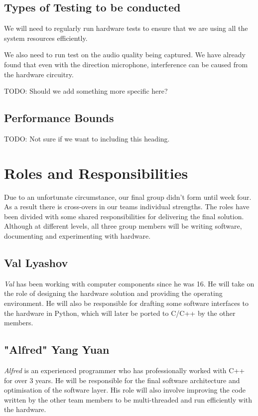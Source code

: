 \documentclass[11pt,a4paper,titlepage]{report}
\begin{document}
\subsection{Types of Testing to be conducted}

We will need to regularly run hardware tests to ensure that we are using all the system resources efficiently.

We also need to run test on the audio quality being captured. We have already found that even with the direction microphone, interference can be caused from the hardware circuitry. 

{\color{red} TODO: Should we add something more specific here? }


\subsection{Performance Bounds}

{\color{red} TODO: Not sure if we want to including this heading.  }




\section{Roles and Responsibilities}



Due to an unfortunate circumstance, our final group didn't form until week four. As a result there is cross-overs in our teams individual strengths. The roles have been divided with some shared responsibilities for delivering the final solution. Although at different levels, all three group members will be writing software, documenting and experimenting with hardware.


\subsection{Val Lyashov}
\textit{Val} has been working with computer components since he was 16. He will take on the role of designing the hardware solution and providing the operating environment. He will also be responsible for drafting some software interfaces to the hardware in Python, which will later be ported to C/C++ by the other members.


\subsection{"Alfred" Yang Yuan}
\textit{Alfred} is an experienced programmer who has professionally worked with C++ for over 3 years. He will be responsible for the final software architecture and optimisation of the software layer. His role will also involve improving the code written by the other team members to be multi-threaded and run efficiently with the hardware.
\end{document}
